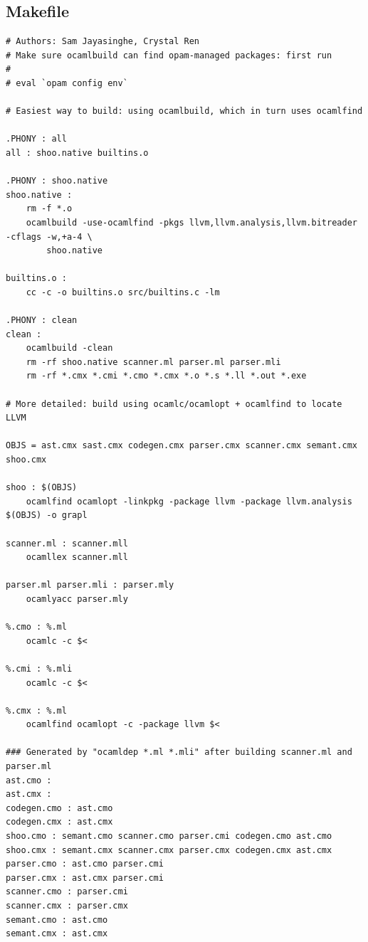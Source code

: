 \documentclass[12pt]{article}
\begin{document}
\subsection{Makefile}
\begin{mdframed}[hidealllines=true,backgroundcolor=blue!20]
\begin{lstlisting}
# Authors: Sam Jayasinghe, Crystal Ren
# Make sure ocamlbuild can find opam-managed packages: first run
#
# eval `opam config env`

# Easiest way to build: using ocamlbuild, which in turn uses ocamlfind

.PHONY : all
all : shoo.native builtins.o

.PHONY : shoo.native
shoo.native :
	rm -f *.o
	ocamlbuild -use-ocamlfind -pkgs llvm,llvm.analysis,llvm.bitreader -cflags -w,+a-4 \
		shoo.native

builtins.o :
	cc -c -o builtins.o src/builtins.c -lm

.PHONY : clean
clean :
	ocamlbuild -clean
	rm -rf shoo.native scanner.ml parser.ml parser.mli
	rm -rf *.cmx *.cmi *.cmo *.cmx *.o *.s *.ll *.out *.exe

# More detailed: build using ocamlc/ocamlopt + ocamlfind to locate LLVM

OBJS = ast.cmx sast.cmx codegen.cmx parser.cmx scanner.cmx semant.cmx shoo.cmx

shoo : $(OBJS)
	ocamlfind ocamlopt -linkpkg -package llvm -package llvm.analysis $(OBJS) -o grapl

scanner.ml : scanner.mll
	ocamllex scanner.mll

parser.ml parser.mli : parser.mly
	ocamlyacc parser.mly

%.cmo : %.ml
	ocamlc -c $<

%.cmi : %.mli
	ocamlc -c $<

%.cmx : %.ml
	ocamlfind ocamlopt -c -package llvm $<

### Generated by "ocamldep *.ml *.mli" after building scanner.ml and parser.ml
ast.cmo :
ast.cmx :
codegen.cmo : ast.cmo
codegen.cmx : ast.cmx
shoo.cmo : semant.cmo scanner.cmo parser.cmi codegen.cmo ast.cmo
shoo.cmx : semant.cmx scanner.cmx parser.cmx codegen.cmx ast.cmx
parser.cmo : ast.cmo parser.cmi
parser.cmx : ast.cmx parser.cmi
scanner.cmo : parser.cmi
scanner.cmx : parser.cmx
semant.cmo : ast.cmo
semant.cmx : ast.cmx

\end{lstlisting}
\end{mdframed}
\end{document}

